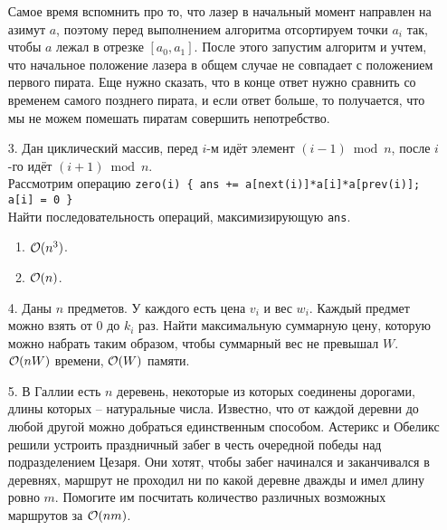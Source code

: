 \begin{enumerate}
\begin{solution}
    Самое время вспомнить про то, что лазер в начальный момент направлен на азимут $a$, поэтому перед выполнением алгоритма отсортируем точки $a_i$ так, чтобы $a$ лежал в отрезке $[a_0, a_1]$. После этого запустим алгоритм и учтем, что начальное положение лазера в общем случае не совпадает с положением первого пирата. Еще нужно сказать, что в конце ответ нужно сравнить со временем самого позднего пирата, и если ответ больше, то получается, что мы не можем помешать пиратам совершить непотребство.
  \end{solution}
    

  \item[3.]
    Дан циклический массив, перед $i$-м идёт элемент $(i{-}1) \bmod n$,
    после $i$-го идёт $(i{+}1) \bmod n$. \\
    Рассмотрим операцию \texttt{zero(i) \{ ans += a[next(i)]*a[i]*a[prev(i)]; a[i] = 0 \}}\\
    Найти последовательность операций, максимизирующую \texttt{ans}.
    \begin{enumerate}
      \item $\mathcal{O}(n^3)$.
      \item $\mathcal{O}(n)$.
    \end{enumerate}

  \item[4.]
    Даны $n$ предметов. У каждого есть цена $v_i$ и вес $w_i$. Каждый предмет можно взять
    от $0$ до $k_i$ раз. Найти максимальную суммарную цену,
    которую можно набрать таким образом, чтобы суммарный вес не превышал $W$.
    $\mathcal{O}(nW)$ времени, $\mathcal{O}(W)$ памяти.

  \item[5.] 
    В Галлии есть $n$ деревень, некоторые из которых соединены дорогами, длины которых --
    натуральные числа. Известно, что от каждой деревни до любой другой можно добраться
    единственным способом. Астерикс и Обеликс решили устроить праздничный забег в честь
    очередной победы над подразделением Цезаря. Они хотят, чтобы забег начинался и заканчивался
    в деревнях, маршрут не проходил ни по какой деревне дважды и имел длину ровно $m$.
    Помогите им посчитать количество различных возможных маршрутов за $\mathcal{O}(nm)$.


\end{enumerate}
